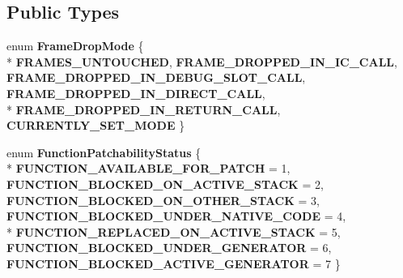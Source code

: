 \subsection*{Public Types}
\begin{DoxyCompactItemize}
\item 
\hypertarget{classv8_1_1internal_1_1_live_edit_a724dd57efc0973924e2a4e2201c1285d}{}enum {\bfseries Frame\+Drop\+Mode} \{ \\*
{\bfseries F\+R\+A\+M\+E\+S\+\_\+\+U\+N\+T\+O\+U\+C\+H\+E\+D}, 
{\bfseries F\+R\+A\+M\+E\+\_\+\+D\+R\+O\+P\+P\+E\+D\+\_\+\+I\+N\+\_\+\+I\+C\+\_\+\+C\+A\+L\+L}, 
{\bfseries F\+R\+A\+M\+E\+\_\+\+D\+R\+O\+P\+P\+E\+D\+\_\+\+I\+N\+\_\+\+D\+E\+B\+U\+G\+\_\+\+S\+L\+O\+T\+\_\+\+C\+A\+L\+L}, 
{\bfseries F\+R\+A\+M\+E\+\_\+\+D\+R\+O\+P\+P\+E\+D\+\_\+\+I\+N\+\_\+\+D\+I\+R\+E\+C\+T\+\_\+\+C\+A\+L\+L}, 
\\*
{\bfseries F\+R\+A\+M\+E\+\_\+\+D\+R\+O\+P\+P\+E\+D\+\_\+\+I\+N\+\_\+\+R\+E\+T\+U\+R\+N\+\_\+\+C\+A\+L\+L}, 
{\bfseries C\+U\+R\+R\+E\+N\+T\+L\+Y\+\_\+\+S\+E\+T\+\_\+\+M\+O\+D\+E}
 \}\label{classv8_1_1internal_1_1_live_edit_a724dd57efc0973924e2a4e2201c1285d}

\item 
\hypertarget{classv8_1_1internal_1_1_live_edit_a06d3bb41b3481e311a84e0c27c40a527}{}enum {\bfseries Function\+Patchability\+Status} \{ \\*
{\bfseries F\+U\+N\+C\+T\+I\+O\+N\+\_\+\+A\+V\+A\+I\+L\+A\+B\+L\+E\+\_\+\+F\+O\+R\+\_\+\+P\+A\+T\+C\+H} = 1, 
{\bfseries F\+U\+N\+C\+T\+I\+O\+N\+\_\+\+B\+L\+O\+C\+K\+E\+D\+\_\+\+O\+N\+\_\+\+A\+C\+T\+I\+V\+E\+\_\+\+S\+T\+A\+C\+K} = 2, 
{\bfseries F\+U\+N\+C\+T\+I\+O\+N\+\_\+\+B\+L\+O\+C\+K\+E\+D\+\_\+\+O\+N\+\_\+\+O\+T\+H\+E\+R\+\_\+\+S\+T\+A\+C\+K} = 3, 
{\bfseries F\+U\+N\+C\+T\+I\+O\+N\+\_\+\+B\+L\+O\+C\+K\+E\+D\+\_\+\+U\+N\+D\+E\+R\+\_\+\+N\+A\+T\+I\+V\+E\+\_\+\+C\+O\+D\+E} = 4, 
\\*
{\bfseries F\+U\+N\+C\+T\+I\+O\+N\+\_\+\+R\+E\+P\+L\+A\+C\+E\+D\+\_\+\+O\+N\+\_\+\+A\+C\+T\+I\+V\+E\+\_\+\+S\+T\+A\+C\+K} = 5, 
{\bfseries F\+U\+N\+C\+T\+I\+O\+N\+\_\+\+B\+L\+O\+C\+K\+E\+D\+\_\+\+U\+N\+D\+E\+R\+\_\+\+G\+E\+N\+E\+R\+A\+T\+O\+R} = 6, 
{\bfseries F\+U\+N\+C\+T\+I\+O\+N\+\_\+\+B\+L\+O\+C\+K\+E\+D\+\_\+\+A\+C\+T\+I\+V\+E\+\_\+\+G\+E\+N\+E\+R\+A\+T\+O\+R} = 7
 \}\label{classv8_1_1internal_1_1_live_edit_a06d3bb41b3481e311a84e0c27c40a527}

\end{DoxyCompactItemize}
